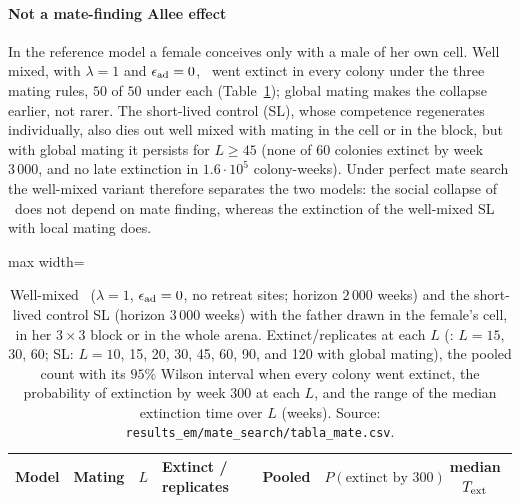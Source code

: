\paragraph{Not a mate-finding Allee effect}
In the reference model a female conceives only with a male of her own cell. Well mixed, with $\lambda=1$ and
$\epsilon_{\rm ad}=0$, \Cone\ went extinct in every colony under the three mating rules, $50$ of $50$ under each
(Table~\ref{tab:sm-mate}); global mating makes the collapse earlier, not rarer. The short-lived control (SL), whose
competence regenerates individually, also dies out well mixed with mating in the cell or in the block, but with
global mating it persists for $L\ge45$ (none of $60$ colonies extinct by week $3\,000$, and no late extinction in $1.6\cdot10^5$
colony-weeks). Under perfect mate search the well-mixed variant therefore separates the two
models: the social collapse of \Cone\ does not depend on mate finding, whereas the extinction of the well-mixed SL with
local mating does.

\begin{table}[ht]
\centering
\caption{Well-mixed \Cone\ ($\lambda=1$, $\epsilon_{\rm ad}=0$, no retreat sites; horizon $2\,000$ weeks) and the short-lived
control SL (horizon $3\,000$ weeks) with the father drawn in the female's cell, in her $3\times3$ block or in the
whole arena. Extinct/replicates at each $L$ (\Cone: $L=15$, $30$, $60$; SL: $L=10$, 15, 20, 30, 45, 60, 90, and 120
with global mating), the pooled count with its $95\%$ Wilson interval when every colony went extinct, the probability
of extinction by week 300 at each $L$, and the range of the median extinction time over $L$ (weeks). Source:
\texttt{results\_em/mate\_search/tabla\_mate.csv}.}
\label{tab:sm-mate}
\scriptsize
\setlength{\tabcolsep}{3pt}
\begin{adjustbox}{max width=\textwidth}
\begin{tabular}{@{}llllllc@{}}
\toprule
Model & Mating & $L$ & Extinct / replicates & Pooled & $P(\text{extinct by }300)$ & median $T_{\rm ext}$ \\
\midrule

\end{tabular}
\end{adjustbox}
\end{table}

